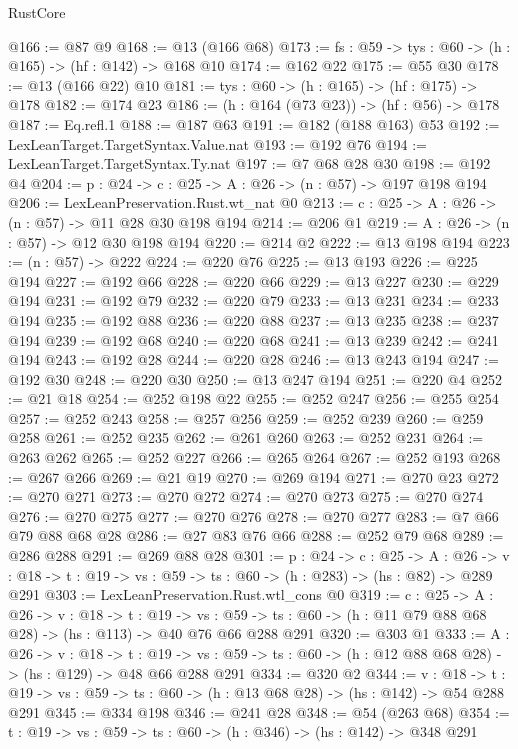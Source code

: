 \begin{lexlean}{RustCore}
\begin{coremodule}
@166 := @87 @9
@168 := @13 (@166 @68)
@173 := {fs : @59} -> {tys : @60} -> (h : @165) -> (hf : @142) -> @168 @10
@174 := @162 @22
@175 := @55 @30
@178 := @13 (@166 @22) @10
@181 := {tys : @60} -> (h : @165) -> (hf : @175) -> @178
@182 := @174 @23
@186 := (h : @164 (@73 @23)) -> (hf : @56) -> @178
@187 := Eq.refl.{1}
@188 := @187 @63
@191 := @182 (@188 @163) @53
@192 := LexLeanTarget.TargetSyntax.Value.nat
@193 := @192 @76
@194 := LexLeanTarget.TargetSyntax.Ty.nat
@197 := @7 @68 @28 @30
@198 := @192 @4
@204 := {p : @24} -> {c : @25} -> {A : @26} -> (n : @57) -> @197 @198 @194
@206 := LexLeanPreservation.Rust.wt_nat @0
@213 := {c : @25} -> {A : @26} -> (n : @57) -> @11 @28 @30 @198 @194
@214 := @206 @1
@219 := {A : @26} -> (n : @57) -> @12 @30 @198 @194
@220 := @214 @2
@222 := @13 @198 @194
@223 := (n : @57) -> @222
@224 := @220 @76
@225 := @13 @193
@226 := @225 @194
@227 := @192 @66
@228 := @220 @66
@229 := @13 @227
@230 := @229 @194
@231 := @192 @79
@232 := @220 @79
@233 := @13 @231
@234 := @233 @194
@235 := @192 @88
@236 := @220 @88
@237 := @13 @235
@238 := @237 @194
@239 := @192 @68
@240 := @220 @68
@241 := @13 @239
@242 := @241 @194
@243 := @192 @28
@244 := @220 @28
@246 := @13 @243 @194
@247 := @192 @30
@248 := @220 @30
@250 := @13 @247 @194
@251 := @220 @4
@252 := @21 @18
@254 := @252 @198 @22
@255 := @252 @247
@256 := @255 @254
@257 := @252 @243
@258 := @257 @256
@259 := @252 @239
@260 := @259 @258
@261 := @252 @235
@262 := @261 @260
@263 := @252 @231
@264 := @263 @262
@265 := @252 @227
@266 := @265 @264
@267 := @252 @193
@268 := @267 @266
@269 := @21 @19
@270 := @269 @194
@271 := @270 @23
@272 := @270 @271
@273 := @270 @272
@274 := @270 @273
@275 := @270 @274
@276 := @270 @275
@277 := @270 @276
@278 := @270 @277
@283 := @7 @66 @79 @88 @68 @28
@286 := @27 @83 @76 @66
@288 := @252 @79 @68
@289 := @286 @288
@291 := @269 @88 @28
@301 := {p : @24} ->
  {c : @25} ->
  {A : @26} ->
  {v : @18} -> {t : @19} -> {vs : @59} -> {ts : @60} -> (h : @283) -> (hs : @82) -> @289 @291
@303 := LexLeanPreservation.Rust.wtl_cons @0
@319 := {c : @25} ->
  {A : @26} ->
  {v : @18} ->
  {t : @19} ->
  {vs : @59} -> {ts : @60} -> (h : @11 @79 @88 @68 @28) -> (hs : @113) -> @40 @76 @66 @288 @291
@320 := @303 @1
@333 := {A : @26} ->
  {v : @18} ->
  {t : @19} -> {vs : @59} -> {ts : @60} -> (h : @12 @88 @68 @28) -> (hs : @129) -> @48 @66 @288 @291
@334 := @320 @2
@344 := {v : @18} ->
  {t : @19} -> {vs : @59} -> {ts : @60} -> (h : @13 @68 @28) -> (hs : @142) -> @54 @288 @291
@345 := @334 @198
@346 := @241 @28
@348 := @54 (@263 @68)
@354 := {t : @19} -> {vs : @59} -> {ts : @60} -> (h : @346) -> (hs : @142) -> @348 @291

\end{coremodule}
\end{lexlean}
